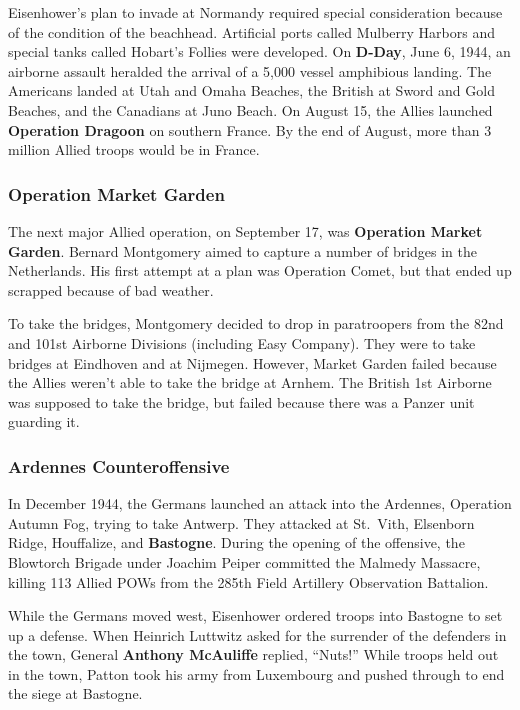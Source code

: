 Eisenhower's plan to invade at Normandy required special consideration
because of the condition of the beachhead.
Artificial ports called Mulberry Harbors and special tanks called Hobart's Follies were developed.
On \textbf{D-Day}, June 6, 1944,
an airborne assault heralded the arrival of a 5,000 vessel amphibious landing.
The Americans landed at Utah and Omaha Beaches,
the British at Sword and Gold Beaches,
and the Canadians at Juno Beach.
On August 15, the Allies launched \textbf{Operation Dragoon} on southern France.
By the end of August, more than 3 million Allied troops would be in France.

\subsubsection*{Operation Market Garden}

The next major Allied operation, on September 17, was \textbf{Operation Market Garden}.
Bernard Montgomery aimed to capture a number of bridges in the Netherlands.
His first attempt at a plan was Operation Comet, but that ended up scrapped because of bad weather.

To take the bridges,
Montgomery decided to drop in paratroopers from the 82nd and 101st Airborne Divisions
(including Easy Company).
They were to take bridges at Eindhoven and at Nijmegen.
However, Market Garden failed because the Allies weren't able to take the bridge at Arnhem.
The British 1st Airborne was supposed to take the bridge,
but failed because there was a Panzer unit guarding it.

\subsubsection*{Ardennes Counteroffensive}

In December 1944, the Germans launched an attack into the Ardennes, Operation Autumn Fog,
trying to take Antwerp.
They attacked at St.\ Vith, Elsenborn Ridge, Houffalize, and \textbf{Bastogne}.
During the opening of the offensive,
the Blowtorch Brigade under Joachim Peiper committed the Malmedy Massacre,
killing 113 Allied POWs from the 285th Field Artillery Observation Battalion.

While the Germans moved west, Eisenhower ordered troops into Bastogne to set up a defense.
When Heinrich Luttwitz asked for the surrender of the defenders in the town,
General \textbf{Anthony McAuliffe} replied, ``Nuts!''
While troops held out in the town,
Patton took his army from Luxembourg and pushed through to end the siege at Bastogne.

